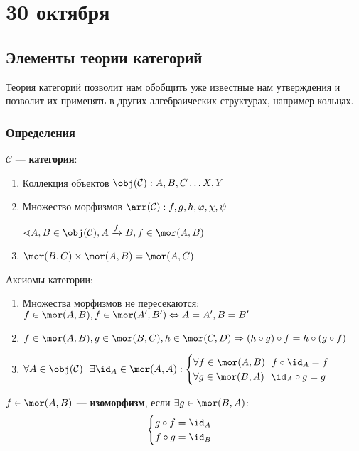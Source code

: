 \chapter{30 октября}

\section{Элементы теории категорий}

Теория категорий позволит нам обобщить уже известные нам утверждения и позволит их применять в других алгебраических структурах, например кольцах.

\subsection{Определения}

\begin{definition}
    \(\mathcal{C}\) --- \textbf{категория}:
    \begin{enumerate}
        \item Коллекция объектов \(\obj(\mathcal{C}) : A, B, C \dots X, Y\)
        \item Множество морфизмов \(\arr(\mathcal{C}) : f, g, h, \varphi ,\chi, \psi\)

              \(\sphericalangle A, B \in \obj (\mathcal{C}), A \xrightarrow{f} B, f \in \mor(A, B)\)
        \item \(\mor(B, C) \times \mor(A, B) = \mor(A, C)\)
    \end{enumerate}
\end{definition}

Аксиомы категории:
\begin{enumerate}
    \item Множества морфизмов не пересекаются: \(f \in \mor(A, B), f \in \mor(A', B') \Leftrightarrow A = A', B = B'\)
    \item \(f \in \mor(A, B), g \in \mor(B, C), h \in \mor(C, D) \Rightarrow (h \circ g) \circ f = h \circ (g \circ f)\)
    \item \(\forall A \in \obj(\mathcal{C}) \ \ \exists \id_A \in \mor(A, A) : \begin{cases}
              \forall f \in \mor(A, B) \ \ f \circ \id_A = f \\
              \forall g \in \mor(B, A) \ \ \id_A \circ g = g
          \end{cases}\)
\end{enumerate}

\begin{definition}
    \(f \in \mor(A, B)\) --- \textbf{изоморфизм}, если \(\exists g \in \mor(B, A)\):
    \[\begin{cases}
            g \circ f = \id_A \\
            f \circ g = \id_B
        \end{cases}\]
\end{definition}

